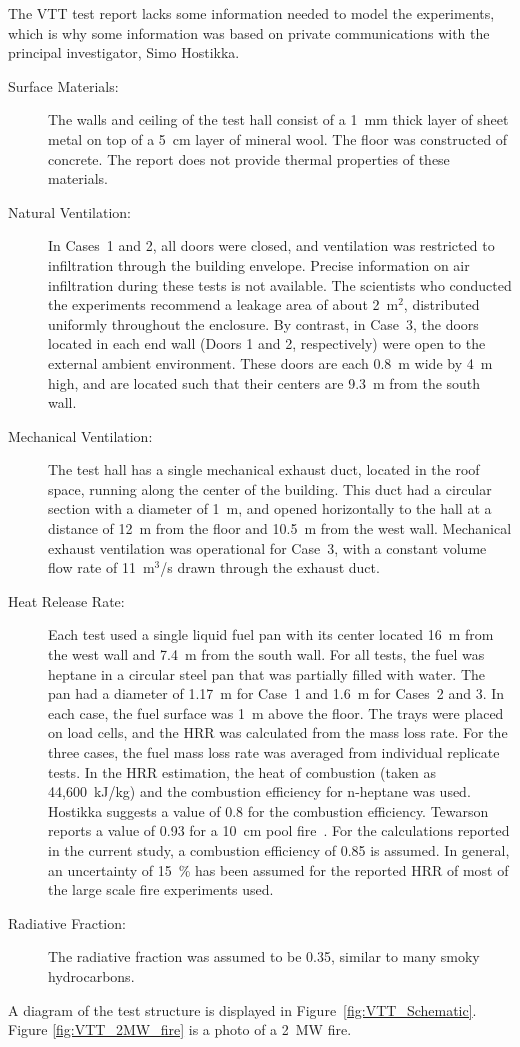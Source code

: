 The VTT test report lacks some information needed to model the experiments, which is why some information was based on private communications with the
principal investigator, Simo Hostikka.
\begin{description}
\item[Surface Materials:] The walls and ceiling of the test hall consist of a 1~mm thick layer of sheet metal on top of a 5~cm layer of mineral wool. The floor was constructed of concrete. The report does not provide thermal properties of these materials.
\item[Natural Ventilation:] In Cases~1 and 2, all doors were closed, and ventilation was restricted to infiltration through the building envelope. Precise information on air infiltration during these tests is not available. The scientists who conducted the experiments recommend a leakage area of about 2~m$^2$, distributed uniformly throughout the enclosure. By contrast, in Case~3, the doors located in each end wall (Doors 1 and 2, respectively) were open to the external ambient environment. These doors are each 0.8~m wide by 4~m high, and are located such that their centers are 9.3~m from the south wall.
\item[Mechanical Ventilation:] The test hall has a single mechanical exhaust duct, located in the roof space, running along the center of the building. This duct had a circular section with a diameter of 1~m, and opened horizontally to the hall at a distance of 12~m from the floor and 10.5~m from the west wall. Mechanical exhaust ventilation was operational for Case~3, with a constant volume flow rate of 11~m$^3$/s drawn through the exhaust duct.
\item[Heat Release Rate:] Each test used a single liquid fuel pan with its center located 16~m from the west wall and 7.4~m from the south wall. For all tests, the fuel was heptane in a circular steel pan that was partially filled with water. The pan had a diameter of 1.17~m for Case~1 and 1.6~m for Cases~2 and 3. In each case, the fuel surface was 1~m above the floor. The trays were placed on load cells, and the HRR was calculated from the mass loss rate. For the three cases, the fuel mass loss rate was averaged from individual replicate tests. In the HRR estimation, the heat of combustion (taken as 44,600~kJ/kg) and the combustion efficiency for n-heptane was used. Hostikka suggests a value of 0.8 for the combustion efficiency. Tewarson reports a value of 0.93 for a 10~cm pool fire~\cite{Tewarson:2003}. For the calculations reported in the current study, a combustion efficiency of 0.85 is assumed. In general, an uncertainty of 15~\% has been assumed for the reported HRR of most of the large scale fire experiments used.
\item[Radiative Fraction:] The radiative fraction was assumed to be 0.35, similar to many smoky hydrocarbons.
\end{description}
A diagram of the test structure is displayed in Figure~\ref{fig:VTT_Schematic}. Figure \ref{fig:VTT_2MW_fire} is a photo of a 2~MW fire.

